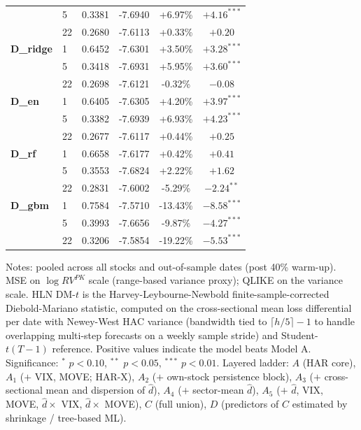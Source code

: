 \begin{table}[htbp]
\begin{tabular}{llcccc}
 &  5 & 0.3381 & -7.6940 & +6.97\% & $+4.16^{***}$ \\
 & 22 & 0.2680 & -7.6113 & +0.33\% & $+0.20$ \\
\midrule
\textbf{D\_ridge} &  1 & 0.6452 & -7.6301 & +3.50\% & $+3.28^{***}$ \\
 &  5 & 0.3418 & -7.6931 & +5.95\% & $+3.60^{***}$ \\
 & 22 & 0.2698 & -7.6121 & -0.32\% & $-0.08$ \\
\midrule
\textbf{D\_en} &  1 & 0.6405 & -7.6305 & +4.20\% & $+3.97^{***}$ \\
 &  5 & 0.3382 & -7.6939 & +6.93\% & $+4.23^{***}$ \\
 & 22 & 0.2677 & -7.6117 & +0.44\% & $+0.25$ \\
\midrule
\textbf{D\_rf} &  1 & 0.6658 & -7.6177 & +0.42\% & $+0.41$ \\
 &  5 & 0.3553 & -7.6824 & +2.22\% & $+1.62$ \\
 & 22 & 0.2831 & -7.6002 & -5.29\% & $-2.24^{**}$ \\
\midrule
\textbf{D\_gbm} &  1 & 0.7584 & -7.5710 & -13.43\% & $-8.58^{***}$ \\
 &  5 & 0.3993 & -7.6656 & -9.87\% & $-4.27^{***}$ \\
 & 22 & 0.3206 & -7.5854 & -19.22\% & $-5.53^{***}$ \\
\bottomrule
\end{tabular}
\begin{tablenotes}\small
\item Notes: pooled across all stocks and out-of-sample dates (post 40\% warm-up). MSE on $\log RV^{PK}$ scale (range-based variance proxy); QLIKE on the variance scale. HLN DM-$t$ is the Harvey-Leybourne-Newbold finite-sample-corrected Diebold-Mariano statistic, computed on the cross-sectional mean loss differential per date with Newey-West HAC variance (bandwidth tied to $\lceil h / 5 \rceil - 1$ to handle overlapping multi-step forecasts on a weekly sample stride) and Student-$t(T-1)$ reference. Positive values indicate the model beats Model A. Significance: $^{*}$ $p<0.10$, $^{**}$ $p<0.05$, $^{***}$ $p<0.01$. Layered ladder: $A$ (HAR core), $A_1$ ($+$ VIX, MOVE; HAR-X), $A_2$ ($+$ own-stock persistence block), $A_3$ ($+$ cross-sectional mean and dispersion of $\hat d$), $A_4$ ($+$ sector-mean $\hat d$), $A_5$ ($+$ $\hat d$, VIX, MOVE, $\hat d \times$ VIX, $\hat d \times$ MOVE), $C$ (full union), $D$ (predictors of $C$ estimated by shrinkage / tree-based ML).
\end{tablenotes}
\end{table}
